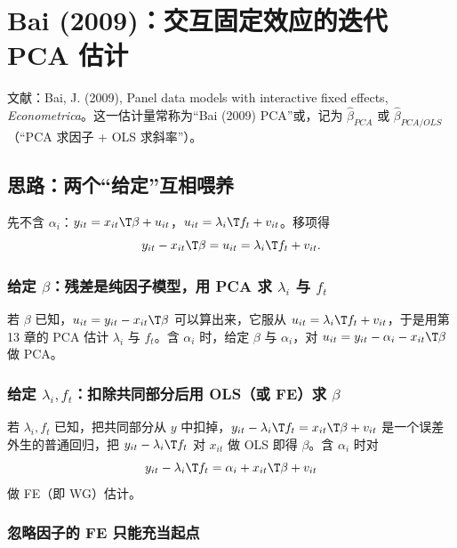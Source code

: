 \section{Bai (2009)：交互固定效应的迭代 PCA 估计}\label{sec:U14a-bai}

文献：Bai, J. (2009), Panel data models with interactive fixed effects, \emph{Econometrica}。这一估计量常称为“Bai (2009) PCA”或，记为 $\hat\beta_{PCA}$ 或 $\hat\beta_{PCA/OLS}$（“PCA 求因子 + OLS 求斜率”）。

\subsection{思路：两个“给定”互相喂养}

先不含 $\alpha_i$：$y_{it}=x_{it}\T\beta+u_{it}$，$u_{it}=\lambda_i\T f_t+v_{it}$。移项得
\[
y_{it}-x_{it}\T\beta=u_{it}=\lambda_i\T f_t+v_{it}.
\]

\subsubsection{给定 \texorpdfstring{$\beta$}{beta}：残差是纯因子模型，用 PCA 求 \texorpdfstring{$\lambda_i$}{lambda\_i} 与 \texorpdfstring{$f_t$}{f\_t}}

若 $\beta$ 已知，$u_{it}=y_{it}-x_{it}\T\beta$ 可以算出来，它服从 $u_{it}=\lambda_i\T f_t+v_{it}$，于是用第 13 章的 PCA 估计 $\lambda_i$ 与 $f_t$。含 $\alpha_i$ 时，给定 $\beta$ 与 $\alpha_i$，对 $u_{it}=y_{it}-\alpha_i-x_{it}\T\beta$ 做 PCA。

\subsubsection{给定 \texorpdfstring{$\lambda_i,f_t$}{lambda\_i, f\_t}：扣除共同部分后用 OLS（或 FE）求 \texorpdfstring{$\beta$}{beta}}

若 $\lambda_i,f_t$ 已知，把共同部分从 $y$ 中扣掉，$y_{it}-\lambda_i\T f_t=x_{it}\T\beta+v_{it}$ 是一个误差外生的普通回归，把 $y_{it}-\lambda_i\T f_t$ 对 $x_{it}$ 做 OLS 即得 $\beta$。含 $\alpha_i$ 时对
\[
y_{it}-\lambda_i\T f_t=\alpha_i+x_{it}\T\beta+v_{it}
\]
做 FE（即 WG）估计。

\subsubsection{忽略因子的 FE 只能充当起点}

